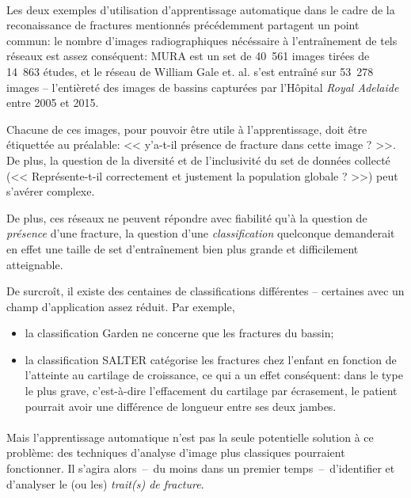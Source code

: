 \documentclass[a4paper]{article}
\begin{document}
\paragraph{}

Les deux exemples d'utilisation d'apprentissage automatique dans le cadre de la reconaissance de fractures mentionnés
précédemment partagent un point commun: le nombre d'images radiographiques nécéssaire à l'entraînement de tels réseaux
est assez conséquent: MURA\cite{mura-paper} est un set de 40~561 images tirées de 14~863 études, et le réseau de William
Gale et. al. s'est entraîné sur 53~278 images -- l'entièreté des images de bassins capturées par l'Hôpital \emph{Royal
Adelaide} entre 2005 et 2015\cite{detect-hip}.


Chacune de ces images, pour pouvoir être utile à l'apprentissage, doit être étiquettée au préalable: << y'a-t-il
présence de fracture dans cette image ? >>. De plus, la question de la diversité et de l'inclusivité du set de données
collecté (<< Représente-t-il correctement et justement la population globale ? >>) peut s'avérer
complexe\cite{dataset-bias}.

De plus, ces réseaux ne peuvent répondre avec fiabilité qu'à la question de \emph{présence} d'une fracture, la question
d'une \emph{classification} quelconque demanderait en effet une taille de set d'entraînement bien plus grande et
difficilement atteignable.

De surcroît, il existe des centaines de classifications différentes -- certaines avec un champ d'application assez
réduit.  Par exemple, 

\begin{itemize}
    \item la classification Garden\cite{garden-paper} ne concerne que les fractures du bassin; 
    \item la classification SALTER\cite{salter} catégorise les fractures chez l'enfant en fonction de l'atteinte au 
        cartilage de croissance, ce qui a un effet conséquent: dans le type le plus grave, c'est-à-dire 
        l'effacement du cartilage par écrasement, le patient pourrait avoir une différence de longueur 
        entre ses deux jambes.
\end{itemize}

\paragraph{}

Mais l'apprentissage automatique n'est pas la seule potentielle solution à ce problème: des techniques d'analyse d'image
plus classiques pourraient fonctionner.  Il s'agira alors~--~du moins dans un premier temps~--~d'identifier et
d'analyser le (ou les) \emph{trait(s) de fracture}.
\end{document}
